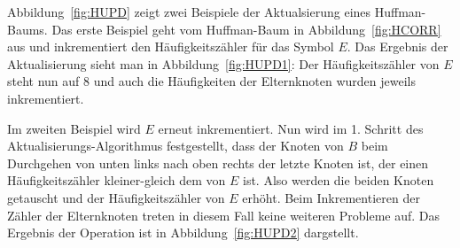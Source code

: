 \documentclass[twoside,11pt,a4paper]{article}
\theoremstyle{break}
\begin{document}
Abbildung~\ref{fig:HUPD} zeigt zwei Beispiele der Aktualsierung eines
Huffman-Baums. Das erste Beispiel geht vom Huffman-Baum in
Abbildung~\ref{fig:HCORR} aus und inkrementiert den Häufigkeitszähler
für das Symbol $E$. Das Ergebnis der Aktualisierung sieht man in
Abbildung~\ref{fig:HUPD1}: Der Häufigkeitszähler von $E$ steht nun auf
8 und auch die Häufigkeiten der Elternknoten wurden jeweils
inkrementiert.

Im zweiten Beispiel wird $E$ erneut inkrementiert. Nun wird im
1. Schritt des Aktualisierungs-Algorithmus festgestellt, dass der
Knoten von $B$ beim Durchgehen von unten links nach oben rechts der
letzte Knoten ist, der einen Häufigkeitszähler kleiner-gleich dem von
$E$ ist. Also werden die beiden Knoten getauscht und der
Häufigkeitszähler von $E$ erhöht. Beim Inkrementieren der Zähler der
Elternknoten treten in diesem Fall keine weiteren Probleme auf. Das
Ergebnis der Operation ist in Abbildung~\ref{fig:HUPD2} dargstellt.
\end{document}
